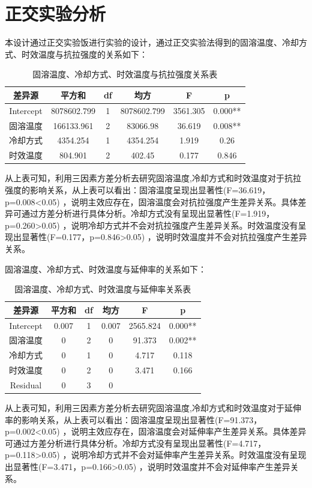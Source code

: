\section{正交实验分析}
本设计通过正交实验饭进行实验的设计，通过正交实验法得到的固溶温度、冷却方式、时效温度与抗拉强度的关系如下：
\begin{table}[htbp]
	\centering
	\caption{固溶温度、冷却方式、时效温度与抗拉强度关系表}
	\label{sec:zjq}
	\begin{tabular}{cccccc}
		\toprule
		 差异源 & 平方和 & df & 均方 & F & p \\
		 	\midrule
Intercept & 8078602.799 & 1 & 8078602.799 & 3561.305 & 0.000** \\
固溶温度 & 166133.961 & 2 & 83066.98 & 36.619 & 0.008** \\
冷却方式 & 4354.254 & 1 & 4354.254 & 1.919 & 0.26 \\
时效温度 & 804.901 & 2 & 402.45 & 0.177 & 0.846 \\
		\bottomrule
	\end{tabular}
\end{table}

从上表可知，利用三因素方差分析去研究固溶温度,冷却方式和时效温度对于抗拉强度的影响关系，从上表可以看出：固溶温度呈现出显著性(F=36.619，p=0.008<0.05) ，说明主效应存在，固溶温度会对抗拉强度产生差异关系。具体差异可通过方差分析进行具体分析。冷却方式没有呈现出显著性(F=1.919，p=0.260>0.05) ，说明冷却方式并不会对抗拉强度产生差异关系。时效温度没有呈现出显著性(F=0.177，p=0.846>0.05) ，说明时效温度并不会对抗拉强度产生差异关系。

固溶温度、冷却方式、时效温度与延伸率的关系如下：
\begin{table}[htbp]
	\centering
	\caption{固溶温度、冷却方式、时效温度与延伸率关系表}
	\label{sec:zjy}
	\begin{tabular}{cccccc}
		\toprule
		差异源 & 平方和 & df & 均方 & F & p \\
		\midrule
Intercept & 0.007 & 1 & 0.007 & 2565.824 & 0.000** \\
固溶温度 & 0 & 2 & 0 & 91.373 & 0.002** \\
冷却方式 & 0 & 1 & 0 & 4.717 & 0.118 \\
时效温度 & 0 & 2 & 0 & 3.471 & 0.166 \\
Residual & 0 & 3 & 0 & ~ & ~ \\
		\bottomrule
	\end{tabular}
\end{table}


从上表可知，利用三因素方差分析去研究固溶温度,冷却方式和时效温度对于延伸率的影响关系，从上表可以看出：固溶温度呈现出显著性(F=91.373，p=0.002<0.05) ，说明主效应存在，固溶温度会对延伸率产生差异关系。具体差异可通过方差分析进行具体分析。冷却方式没有呈现出显著性(F=4.717，p=0.118>0.05) ，说明冷却方式并不会对延伸率产生差异关系。时效温度没有呈现出显著性(F=3.471，p=0.166>0.05) ，说明时效温度并不会对延伸率产生差异关系。
